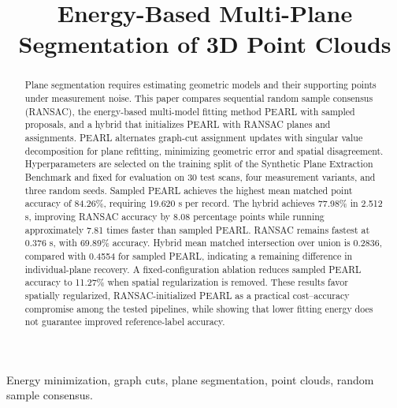 \documentclass[conference]{IEEEtran}
\begin{document}
\title{Energy-Based Multi-Plane Segmentation of 3D Point Clouds}
\author{
}
\maketitle
\begin{abstract}
Plane segmentation requires estimating geometric models and their supporting points under measurement noise. This paper compares sequential random sample consensus (RANSAC), the energy-based multi-model fitting method PEARL with sampled proposals, and a hybrid that initializes PEARL with RANSAC planes and assignments. PEARL alternates graph-cut assignment updates with singular value decomposition for plane refitting, minimizing geometric error and spatial disagreement. Hyperparameters are selected on the training split of the Synthetic Plane Extraction Benchmark and fixed for evaluation on 30 test scans, four measurement variants, and three random seeds. Sampled PEARL achieves the highest mean matched point accuracy of 84.26\%, requiring 19.620 s per record. The hybrid achieves 77.98\% in 2.512 s, improving RANSAC accuracy by 8.08 percentage points while running approximately 7.81 times faster than sampled PEARL. RANSAC remains fastest at 0.376 s, with 69.89\% accuracy. Hybrid mean matched intersection over union is 0.2836, compared with 0.4554 for sampled PEARL, indicating a remaining difference in individual-plane recovery. A fixed-configuration ablation reduces sampled PEARL accuracy to 11.27\% when spatial regularization is removed. These results favor spatially regularized, RANSAC-initialized PEARL as a practical cost--accuracy compromise among the tested pipelines, while showing that lower fitting energy does not guarantee improved reference-label accuracy.
\end{abstract}
\begin{IEEEkeywords}
Energy minimization, graph cuts, plane segmentation, point clouds, random sample consensus.
\end{IEEEkeywords}










\end{document}
